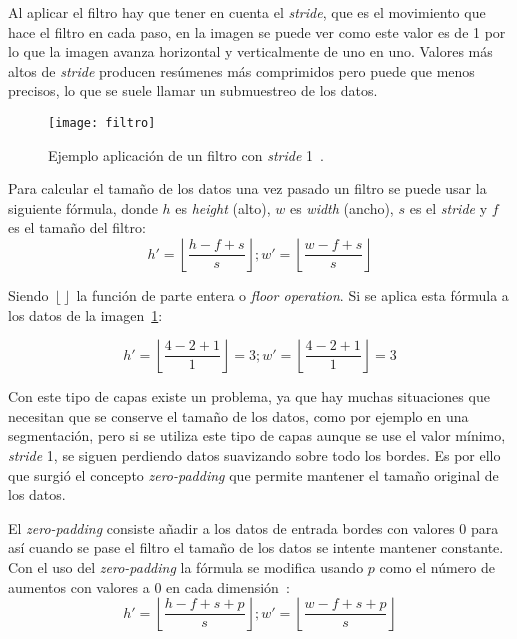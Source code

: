 Al aplicar el filtro hay que tener en cuenta el \textit{stride}, que es el movimiento que hace el filtro en cada paso, en la imagen se puede ver como este valor es de 1 por lo que la imagen avanza horizontal y verticalmente de uno en uno. Valores más altos de \textit{stride} producen resúmenes más comprimidos pero puede que menos precisos, lo que se suele llamar un submuestreo de los datos.

\begin{figure}[h]
	\centering
	\texttt{[image: filtro]}
	\caption{Ejemplo aplicación de un filtro con \textit{stride} 1~\cite{cnn}.}
	\label{fig:filtro}
\end{figure}

Para calcular el tamaño de los datos una vez pasado un filtro se puede usar la siguiente fórmula, donde $h$ es \textit{height} (alto), $w$ es \textit{width} (ancho), $s$ es el \textit{stride} y $f$ es el tamaño del filtro:
\begin{equation}
h'=\left \lfloor \frac{h-f+s}{s} \right \rfloor; w'= \left \lfloor \frac{w-f+s}{s} \right \rfloor
\end{equation}

Siendo $\left \lfloor  \right \rfloor$ la función de parte entera o \textit{floor operation}. Si se aplica esta fórmula a los datos de la imagen~\ref{fig:filtro}:

\begin{equation}
h'=\left \lfloor \frac{4-2+1}{1} \right \rfloor = 3; w'= \left \lfloor \frac{4-2+1}{1} \right \rfloor=3
\end{equation}

Con este tipo de capas existe un problema, ya que hay muchas situaciones que necesitan que se conserve el tamaño de los datos, como por ejemplo en una segmentación, pero si se utiliza este tipo de capas aunque se use el valor mínimo, \textit{stride} 1, se siguen perdiendo datos suavizando sobre todo los bordes. Es por ello que surgió el concepto \textit{zero-padding} que permite mantener el tamaño original de los datos.

El \textit{zero-padding} consiste añadir a los datos de entrada bordes con valores 0 para así cuando se pase el filtro el tamaño de los datos se intente mantener constante. Con el uso del \textit{zero-padding} la fórmula se modifica usando $p$ como el número de aumentos con valores a 0 en cada dimensión~\cite{zeropadding}:
\begin{equation}
h'=\left \lfloor \frac{h-f+s+p}{s} \right \rfloor; w'= \left \lfloor \frac{w-f+s+p}{s} \right \rfloor
\end{equation}

